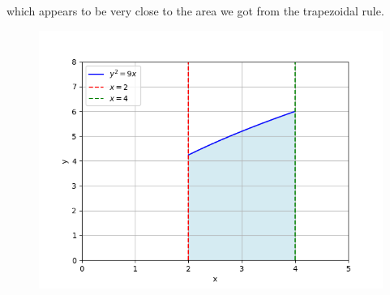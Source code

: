 \documentclass[journal]{IEEEtran}
\numberwithin{equation}{enumi}
\numberwithin{figure}{enumi}
\begin{document}
which appears to be very close to the area we got from the trapezoidal rule.
\begin{figure}[!ht]
    \centering
    \includegraphics[width=\columnwidth]{figs/Figure_1.png}
    \caption{}
\end{figure}
\end{document}
